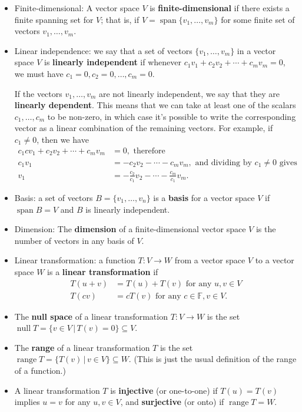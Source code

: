 \documentclass[12pt,letterpaper]{article}
\newcommand{\F}{\mathbb{F}}
\DeclareMathOperator{\spn}{span}
\DeclareMathOperator{\nul}{null}
\DeclareMathOperator{\range}{range}
\begin{document}
\begin{itemize}
{\bf Note:} another translation note -- if we say $V=\spn\{v_1,v_2,\ldots, v_m\}$, we are saying that any vector $v\in V$ can be written as a linear combination of the vectors $v_1,\ldots, v_m$. In other words, $V=\spn\{v_1,v_2,\ldots, v_m\}$ if and only if for every $v\in V$ there exist scalars $c_1,c_2,\ldots, c_m$ such that
\[
v= c_1v_1+c_2v_2+\cdots +c_mv_m.
\]
\item Finite-dimensional: A vector space $V$ is {\bf finite-dimensional} if there exists a finite spanning set for $V$; that is, if $V=\spn\{v_1,\ldots, v_m\}$ for some finite set of vectors $v_1,\ldots, v_m$.
\item Linear independence: we say that a set of vectors $\{v_1,\ldots, v_m\}$ in a vector space $V$ is {\bf linearly independent} if whenever $c_1v_1+c_2v_2+\cdots+c_mv_m=0$, we must have $c_1=0,c_2=0,\ldots, c_m=0$.

If the vectors $v_1,\ldots, v_m$ are not linearly independent, we say that they are {\bf linearly dependent}. This means that we can take at least one of the scalars $c_1,\ldots, c_m$ to be non-zero, in which case it's possible to write the corresponding vector as a linear combination of the remaining vectors. For example, if $c_1\neq 0$, then we have
\begin{align*}
c_1cv_1+c_2v_2+\cdots +c_mv_m& = 0, \text{ therefore }\\
c_1v_1 & = -c_2v_2-\cdots -c_mv_m, \text{ and dividing by $c_1\neq 0$ gives}\\
v_1 & = -\frac{c_2}{c_1}v_2 - \cdots - \frac{c_m}{c_1}v_m.
\end{align*}
\item Basis: a set of vectors $B=\{v_1,\ldots, v_n\}$ is a {\bf basis} for a vector space $V$ if $\spn B=V$ and $B$ is linearly independent.
\item Dimension: The {\bf dimension} of a finite-dimensional vector space $V$ is the number of vectors in any basis of $V$.
\item Linear transformation: a function $T:V\to W$ from a vector space $V$ to a vector space $W$ is a {\bf linear transformation} if
\begin{align*}
T(u+v) & = T(u)+T(v) \text{ for any } u,v\in V\\
T(cv) & = cT(v) \text{ for any } c\in \F, v\in V.
\end{align*}
\item The {\bf null space} of a linear transformation $T:V\to W$ is the set $\nul T = \{v\in V \,|\, T(v)=0\}\subseteq V$.
\item The {\bf range} of a linear transformation $T$ is the set $\range T = \{T(v) \,|\, v\in V\}\subseteq W$. (This is just the usual definition of the range of a function.)
\item A linear transformation $T$ is {\bf injective} (or one-to-one) if $T(u)=T(v)$ implies $u=v$ for any $u,v\in V$, and {\bf surjective} (or onto) if $\range T = W$.
\end{itemize}
\end{document}
